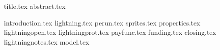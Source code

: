\documentclass[11pt]{llncs}
\begin{document}
{title.tex}
\thispagestyle{plain}
{abstract.tex}

{introduction.tex}
{lightning.tex}
{perun.tex}
{sprites.tex}
{properties.tex}
{lightningopen.tex}
{lightningprot.tex}
{payfunc.tex}
{funding.tex}
{closing.tex}
{lightningnotes.tex}
{model.tex}

\end{document}
